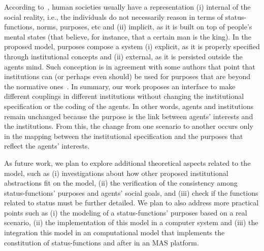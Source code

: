 \documentclass[runningheads]{llncs}
\begin{document}
According to~\cite{DeBrito2014}, human societies usually have a representation (i) internal of the social reality, i.e., the individuals do not necessarily reason in terms of status-functions, norms, purposes, etc and (ii) implicit, as it is built on top of people’s mental states (that believe, for instance, that a certain man is the king). In the proposed model, purposes compose a system (i) explicit, as it is properly specified through institutional concepts and (ii) external, as it is persisted outside the agents mind.
Such conception is in agreement with some authors that point that institutions can (or perhaps even should) be used for purposes that are beyond the normative ones~\cite{Rodriguez-Aguilar2015,fornara2011specifying,telang2019coupled,Tomic2018,Murray-Rust2015,Padget2018}. In summary, our work proposes an interface to make different couplings in different institutions without changing the institutional specification or the coding of the agents. In other words, agents and institutions remain unchanged because the purpose is the link between agents' interests and the institutions. From this, the change from one scenario to another occurs only in the mapping between the institutional specification and the purposes that reflect the agents' interests.

As future work, we plan to explore additional theoretical aspects related to the model, such as (i) investigations about how other proposed institutional abstractions fit on the model, (ii) the verification of the consistency among status-functions' purposes and agents' social goals, and (iii) check if the functions related to status must be further detailed. We plan to also address more practical points such as (i) the modeling of a status-functions' purposes based on a real scenario, (ii) the implementation of this model in a computer system and (iii) the integration this model in an computational model that implements the constitution of status-functions and after in an MAS platform.



%
%


%
\end{document}
